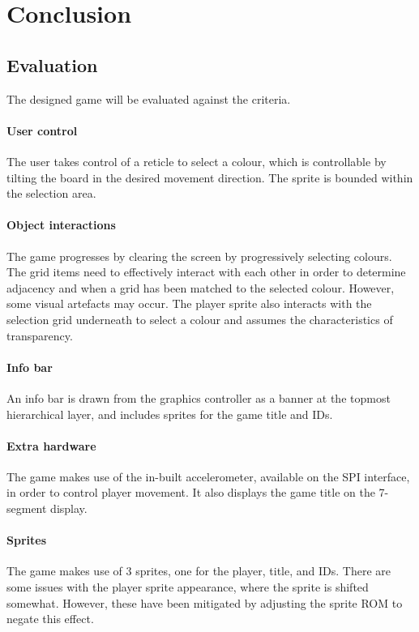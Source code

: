 \section{Conclusion}

\subsection{Evaluation}
The designed game will be evaluated against the criteria. 
\paragraph{User control}
The user takes control of a reticle to select a colour, which is controllable
by tilting the board in the desired movement direction. The sprite is 
bounded within the selection area. 
\paragraph{Object interactions} 
The game progresses by clearing the screen by progressively selecting colours. 
The grid items need to effectively interact with each other in order to determine 
adjacency and when a grid has been matched to the selected colour. However, 
some visual artefacts may occur. 
The player sprite also interacts with the selection grid underneath to select a 
colour and assumes the characteristics of transparency. 
\paragraph{Info bar}
An info bar is drawn from the graphics controller as a banner at the topmost
hierarchical layer, and includes sprites for the game title and IDs. 
\paragraph{Extra hardware}
The game makes use of the in-built accelerometer, available on the SPI interface,
in order to control player movement. It also displays the game title on the 7-segment display. 
\paragraph{Sprites}
The game makes use of 3 sprites, one for the player, title, and IDs. 
There are some issues with the player sprite appearance, where the sprite is shifted somewhat. 
However, these have been mitigated by adjusting the sprite ROM to negate this effect.

